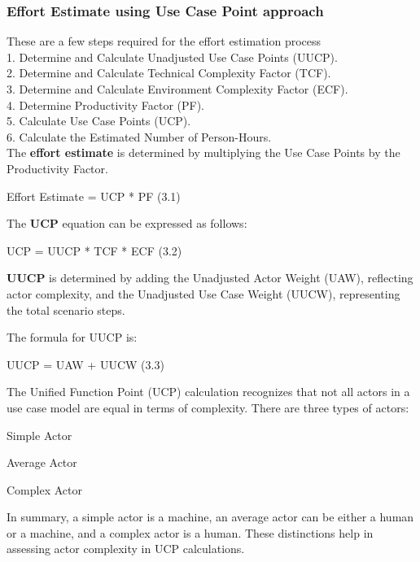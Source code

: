 \subsubsection{Effort Estimate using Use Case Point approach}
\normalsize{These are a few steps required for the effort estimation process\\
1. Determine and Calculate Unadjusted Use Case Points (UUCP).\\
2. Determine and Calculate Technical Complexity Factor (TCF).\\
3. Determine and Calculate Environment Complexity Factor (ECF).\\
4. Determine Productivity Factor (PF).\\
5. Calculate Use Case Points (UCP).\\
6. Calculate the Estimated Number of Person-Hours. \linebreak \\

\normalsize{The \textbf{effort estimate} is determined by multiplying the Use Case Points by the Productivity Factor.}

\normalsize{\centerline{Effort Estimate = UCP * PF (3.1) }}
\hfill\break
\normalsize{The \textbf{UCP} equation can be expressed as follows:}

\normalsize{\centerline{UCP = UUCP * TCF * ECF (3.2) \linebreak[2]}}
\hfill\break
\normalsize{\textbf{UUCP} is determined by adding the Unadjusted Actor Weight (UAW), reflecting actor complexity, and the Unadjusted Use Case Weight (UUCW), representing the total scenario steps. \linebreak}

\normalsize{The formula for UUCP is:}
\normalsize{\centerline{UUCP = UAW + UUCW (3.3) \linebreak}}
\hfill\break

\normalsize{The Unified Function Point (UCP) calculation recognizes that not all actors in a use case model are equal in terms of complexity. There are three types of actors:}

\begin{inparaitem}
    \item Simple Actor
    \item Average Actor
    \item Complex Actor
\end{inparaitem}

\normalsize{In summary, a simple actor is a machine, an average actor can be either a human or a machine, and a complex actor is a human. These distinctions help in assessing actor complexity in UCP calculations. \linebreak}

}
